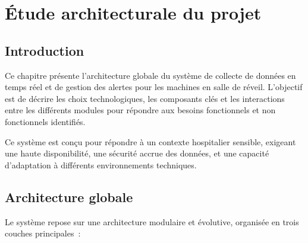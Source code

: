 
\chapter{Étude architecturale du projet}
\label{chap:architecture}

\section{Introduction}
\label{sec:introduction}

Ce chapitre présente l'architecture globale du système de collecte de données en temps réel et de gestion des alertes pour les machines en salle de réveil. L'objectif est de décrire les choix technologiques, les composants clés et les interactions entre les différents modules pour répondre aux besoins fonctionnels et non fonctionnels identifiés.

Ce système est conçu pour répondre à un contexte hospitalier sensible, exigeant une haute disponibilité, une sécurité accrue des données, et une capacité d’adaptation à différents environnements techniques.

\section{Architecture globale}
\label{sec:architecture_globale}

Le système repose sur une architecture modulaire et évolutive, organisée en trois couches principales~:

